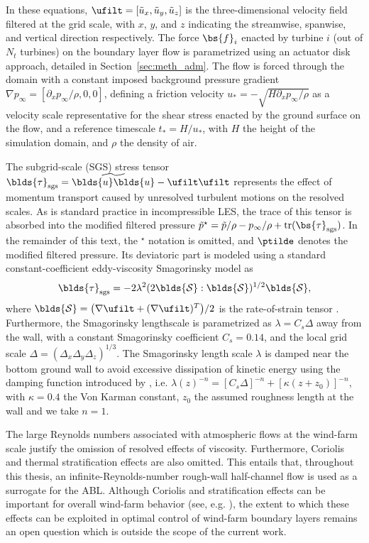 In these equations, $\ufilt = [\tilde{u}_x, \tilde{u}_y, \tilde{u}_z]$ is the three-dimensional velocity field filtered at the grid scale, with $x$, $y$, and $z$ indicating the streamwise, spanwise, and vertical direction respectively. The force $\bs{f}_i$ enacted by turbine $i$ (out of $N_t$ turbines) on the boundary layer flow is parametrized using an actuator disk approach, detailed in Section~\ref{sec:meth_adm}. The flow is forced through the domain with a constant imposed background pressure gradient $\nabla p_\infty = [\partial_x p_\infty/\rho, 0, 0]$, defining a friction velocity $u_* = - \sqrt{H \partial_x p_\infty/\rho}$ as a velocity scale representative for the shear stress enacted by the ground surface on the flow, and a reference timescale $t_* = H/u_*$, with $H$ the height of the simulation domain, and $\rho$ the density of air. 

The subgrid-scale (SGS) stress tensor $\blds{\tau}_{\text{sgs}} = \widetilde{\blds{u} \blds{u}} - \ufilt \ufilt$ represents the effect of momentum transport caused by unresolved turbulent motions on the resolved scales. As is standard practice in incompressible LES, the trace of this tensor is absorbed into the modified filtered pressure $\tilde{p}^\star = \tilde{p}/\rho - p_\infty / \rho + \text{tr}(\bs{\tau}_\text{sgs})$. In the remainder of this text, the $^\star$ notation is omitted, and $\ptilde$ denotes the modified filtered pressure. Its deviatoric part is modeled using a standard constant-coefficient eddy-viscosity Smagorinsky model as 
\begin{equation}
	\blds{\tau}_{\text{sgs}} = - 2 \lambda^2 (2 \blds{\mathcal{S}} : \blds{\mathcal{S}})^{1/2} \blds{\mathcal{S}},
\end{equation}
where $\blds{\mathcal{S}} = \big(\nabla \ufilt + (\nabla \ufilt)^T \big)/2$ is the rate-of-strain tensor \citep{smagorinsky1963general}. Furthermore, the Smagorinsky lengthscale is parametrized as $\lambda = C_s \Delta$ away from the wall, with a constant Smagorinsky coefficient $C_s = 0.14$, and the local grid scale $\Delta = (\Delta_x \Delta_y \Delta_z)^{1/3}$. The Smagorinsky length scale $\lambda$ is damped near the bottom ground wall to avoid excessive dissipation of kinetic energy using the damping function introduced by \cite{mason1992stochastic}, i.e. $\lambda(z)^{-n} = [C_s \Delta]^{-n} + [\kappa (z + z_0)]^{-n}$, with $\kappa = 0.4$ the Von Karman constant, $z_0$ the assumed roughness length at the wall and we take $n = 1$. 

The large Reynolds numbers associated with atmospheric flows at the wind-farm scale justify the omission of resolved effects of viscosity. Furthermore, Coriolis and thermal stratification effects are also omitted. This entails that, throughout this thesis, an infinite-Reynolds-number rough-wall half-channel flow is used as a surrogate for the ABL. Although Coriolis and stratification effects can be important for overall wind-farm behavior (see, e.g. \citealp{allaerts2015large, allaerts2017boundary}), the extent to which these effects can be exploited in optimal control of wind-farm boundary layers remains an open question which is outside the scope of the current work. 

